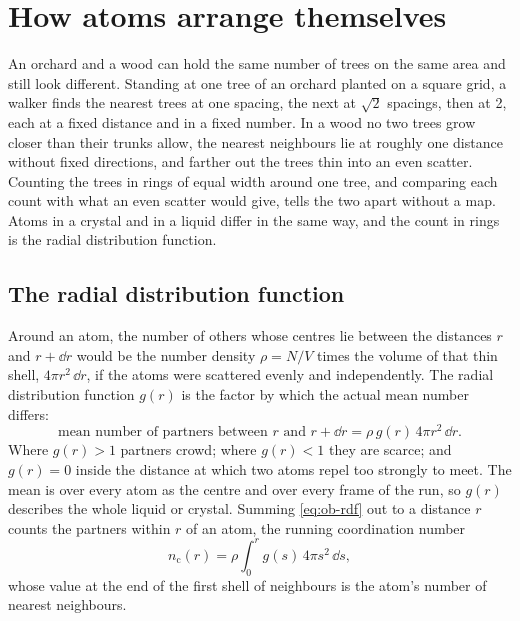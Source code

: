 \section{How atoms arrange themselves}
\label{sec:ob-rdf}

An orchard and a wood can hold the same number of trees on the same area
and still look different. Standing at one tree of an orchard planted on a
square grid, a walker finds the nearest trees at one spacing, the next at
$\sqrt2$ spacings, then at 2, each at a fixed distance and in a fixed
number. In a wood no two trees grow closer than their trunks allow, the
nearest neighbours lie at roughly one distance without fixed directions,
and farther out the trees thin into an even scatter. Counting the trees in
rings of equal width around one tree, and comparing each count with what
an even scatter would give, tells the two apart without a map. Atoms in a
crystal and in a liquid differ in the same way, and the count in rings is
the radial distribution function.

\subsection*{The radial distribution function}

Around an atom, the number of others whose centres lie between the
distances $r$ and $r + \dd r$ would be the number density $\rho = N/V$
times the volume of that thin shell, $4\pi r^2\,\dd r$, if the atoms were
scattered evenly and independently. The radial distribution function
$g(r)$ is the factor by which the actual mean number differs:
\begin{equation}
   \text{mean number of partners between $r$ and $r + \dd r$}
   = \rho\,g(r)\,4\pi r^2\,\dd r .
   \label{eq:ob-rdf}
\end{equation}
Where $g(r) > 1$ partners crowd; where $g(r) < 1$ they are scarce; and
$g(r) = 0$ inside the distance at which two atoms repel too strongly to
meet. The mean is over every atom as the centre and over every frame of
the run, so $g(r)$ describes the whole liquid or crystal.
Summing \cref{eq:ob-rdf} out to a distance $r$ counts the partners within
$r$ of an atom, the running coordination number
\begin{equation*}
   n_{\mathrm c}(r) = \rho\int_0^r g(s)\,4\pi s^2\,\dd s ,
\end{equation*}
whose value at the end of the first shell of neighbours is the atom's
number of nearest neighbours.

